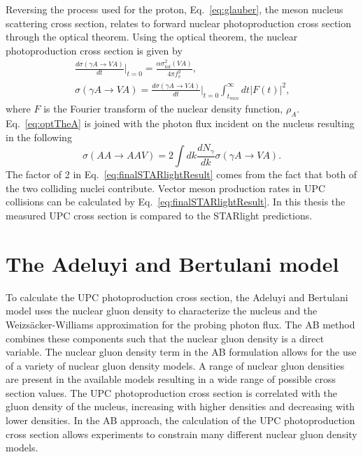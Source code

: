     Reversing the process used for the proton, Eq.~\ref{eq:glauber}, the meson 
      nucleus scattering cross section, relates to forward nuclear 
      photoproduction cross section through the optical theorem. 
    Using the optical theorem, the nuclear photoproduction cross section is 
      given by 
    \begin{eqnarray} \label{eq:optTheA}
      \frac{d\sigma(\gamma A\rightarrow VA)}{dt}\Big|_{t=0}=
      \frac{\alpha\sigma_{tot}^{2}(VA)}{4\pi f_{v}^{2}}\nonumber \textrm{,}\\
      \sigma(\gamma A\rightarrow VA)=\frac{d\sigma(\gamma A\rightarrow VA)}{dt}
      \Big|_{t=0}\int_{t_{min}}^{\infty}dt|F(t)|^{2} \textrm{,}
    \end{eqnarray}
    where $F$ is the Fourier transform of the nuclear density function, 
      $\rho_{A}$.
    Eq.~\ref{eq:optTheA} is joined with the photon flux incident on the nucleus 
      resulting in the following
    \begin{equation} \label{eq:finalSTARlightResult}
      \sigma(AA\rightarrow AAV)=2\int{dk\frac{dN_{\gamma}}{dk}
                    \sigma(\gamma A\rightarrow VA)}.
    \end{equation}
    The factor of 2 in Eq.~\ref{eq:finalSTARlightResult} comes from the fact that 
      both of the two colliding nuclei contribute. 
    Vector meson production rates in UPC collisions can be calculated
      by Eq.~\ref{eq:finalSTARlightResult}.
    In this thesis the measured UPC \JPsi{} cross section is compared to the
      STARlight predictions. 

  \section{The Adeluyi and Bertulani model \label{sec:pQCDapp}}
    To calculate the UPC \JPsi{} photoproduction cross section, the Adeluyi 
      and Bertulani model uses the nuclear gluon density to characterize the 
      nucleus and the Weizs\"{a}cker-Williams approximation for the probing 
      photon flux. 
    The AB method combines these components such that the nuclear gluon 
      density is a direct variable.
    The nuclear gluon density term in the AB formulation allows for 
      the use of a variety of nuclear gluon density models.
    A range of nuclear gluon densities are present in the available models
      resulting in a wide range of possible cross section values. 
    The UPC \JPsi{} photoproduction cross section is correlated with the gluon
      density of the nucleus, increasing with higher densities and decreasing 
      with lower densities. 
    In the AB approach, the calculation of the UPC \JPsi{} photoproduction 
      cross section allows experiments to constrain many different nuclear 
      gluon density models. 
    
